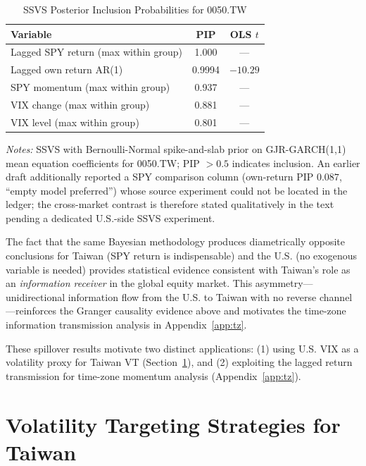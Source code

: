 \begin{table}[H]
\centering
\caption{SSVS Posterior Inclusion Probabilities for 0050.TW}
\label{tab:ssvs_pip}
\begin{tabular}{lcc}
\toprule
Variable & PIP & OLS $t$ \\
\midrule
Lagged SPY return (max within group) & 1.000 & --- \\
Lagged own return AR(1) & 0.9994 & $-10.29$ \\
SPY momentum (max within group) & 0.937 & --- \\
VIX change (max within group) & 0.881 & --- \\
VIX level (max within group) & 0.801 & --- \\
\bottomrule
\end{tabular}
\begin{flushleft}
\small \textit{Notes:} SSVS with Bernoulli-Normal spike-and-slab prior on GJR-GARCH(1,1) mean equation coefficients for 0050.TW; PIP $> 0.5$ indicates inclusion. An earlier draft additionally reported a SPY comparison column (own-return PIP $0.087$, ``empty model preferred'') whose source experiment could not be located in the ledger; the cross-market contrast is therefore stated qualitatively in the text pending a dedicated U.S.-side SSVS experiment.
\end{flushleft}
\end{table}

The fact that the same Bayesian methodology produces diametrically opposite conclusions for Taiwan (SPY return is indispensable) and the U.S. (no exogenous variable is needed) provides statistical evidence consistent with Taiwan's role as an \textit{information receiver} in the global equity market. This asymmetry---unidirectional information flow from the U.S. to Taiwan with no reverse channel---reinforces the Granger causality evidence above and motivates the time-zone information transmission analysis in Appendix~\ref{app:tz}.

These spillover results motivate two distinct applications: (1) using U.S. VIX as a volatility proxy for Taiwan VT (Section~\ref{sec:vt}), and (2) exploiting the lagged return transmission for time-zone momentum analysis (Appendix~\ref{app:tz}).



\section{Volatility Targeting Strategies for Taiwan}
\label{sec:vt}

